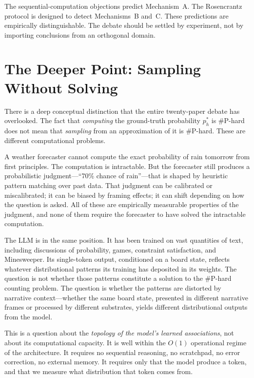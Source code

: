 \documentclass[12pt,a4paper]{article}
\begin{document}
The sequential-computation objections predict Mechanism~A. The Rosencrantz protocol is designed to detect Mechanisms~B and~C. These predictions are empirically distinguishable. The debate should be settled by experiment, not by importing conclusions from an orthogonal domain.

\section{The Deeper Point: Sampling Without Solving}

There is a deep conceptual distinction that the entire twenty-paper debate has overlooked. The fact that \emph{computing} the ground-truth probability $p_h^*$ is \#P-hard does not mean that \emph{sampling} from an approximation of it is \#P-hard. These are different computational problems.

A weather forecaster cannot compute the exact probability of rain tomorrow from first principles. The computation is intractable. But the forecaster still produces a probabilistic judgment---``70\% chance of rain''---that is shaped by heuristic pattern matching over past data. That judgment can be calibrated or miscalibrated; it can be biased by framing effects; it can shift depending on how the question is asked. All of these are empirically measurable properties of the judgment, and none of them require the forecaster to have solved the intractable computation.

The LLM is in the same position. It has been trained on vast quantities of text, including discussions of probability, games, constraint satisfaction, and Minesweeper. Its single-token output, conditioned on a board state, reflects whatever distributional patterns its training has deposited in its weights. The question is not whether those patterns constitute a solution to the \#P-hard counting problem. The question is whether the patterns are distorted by narrative context---whether the same board state, presented in different narrative frames or processed by different substrates, yields different distributional outputs from the model.

This is a question about the \emph{topology of the model's learned associations}, not about its computational capacity. It is well within the $O(1)$ operational regime of the architecture. It requires no sequential reasoning, no scratchpad, no error correction, no external memory. It requires only that the model produce a token, and that we measure what distribution that token comes from.
\end{document}
